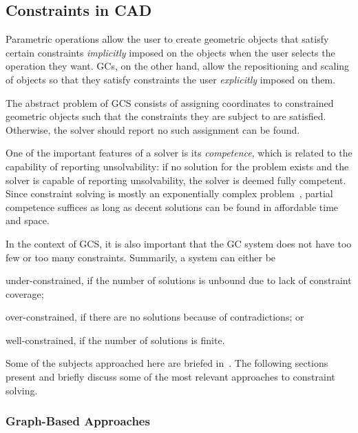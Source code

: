 \subsection{Constraints in CAD}%
\label{sec:intro.constraints}

Parametric operations allow the user to create geometric objects that satisfy
certain constraints \emph{implicitly} imposed on the objects when the user
selects the operation they want.  \Acp{GC}, on the other hand, allow the
repositioning and scaling of objects so that they satisfy constraints the user
\emph{explicitly} imposed on them.

The abstract problem of \ac{GCS} consists of assigning coordinates to
constrained geometric objects such that the constraints they are subject to are
satisfied.  Otherwise, the solver should report no such assignment can be found.

One of the important features of a solver is its \emph{competence}, which is
related to the capability of reporting unsolvability: if no solution for the
problem exists and the solver is capable of reporting unsolvability, the solver
is deemed fully competent.  Since constraint solving is mostly an exponentially
complex problem~\cite{Rossi:2006:Handbook}, partial competence suffices as long
as decent solutions can be found in affordable time and space.

In the context of \ac{GCS}, it is also important that the \ac{GC} system does
not have too few or too many constraints.  Summarily, a system can either be 
\begin{enumerate*}[label= (\arabic*)]
  \item under-constrained, if the number of solutions is unbound due to lack of
  constraint coverage;
  \item over-constrained, if there are no solutions because of contradictions;
  or
  \item well-constrained, if the number of solutions is finite.
\end{enumerate*}

Some of the subjects approached here are briefed in~\cite{Hoffmann:2005:BCS}.
The following sections present and briefly discuss some of the most relevant
approaches to constraint solving.

\subsubsection{Graph-Based Approaches}%
\label{sec:intro.constraints.graph}

